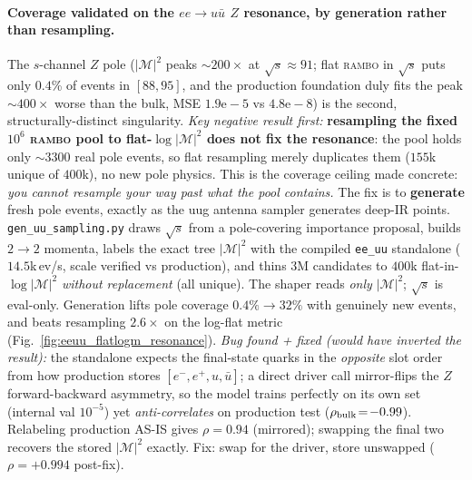\documentclass[11pt]{article}
\newcommand{\code}[1]{\texttt{#1}}
\begin{document}
\paragraph{Coverage validated on the $ee\to u\bar u$ $Z$ resonance, by generation rather than resampling.}
The $s$-channel $Z$ pole ($|\mathcal{M}|^2$ peaks $\sim$$200\times$ at $\sqrt{s}\!\approx\!91$; flat
\textsc{rambo} in $\sqrt{s}$ puts only $0.4$\% of events in $[88,95]$, and the production foundation
duly fits the peak $\sim$$400\times$ worse than the bulk, MSE $1.9\mathrm{e}{-}5$ vs $4.8\mathrm{e}{-}8$)
is the second, structurally-distinct singularity. \emph{Key negative result first:}
\textbf{resampling the fixed $10^6$ \textsc{rambo} pool to flat-$\log|\mathcal{M}|^2$ does not fix the
resonance}: the pool holds only $\sim$$3300$ real pole events, so flat resampling merely duplicates
them ($155$k unique of $400$k), no new pole physics. This is the coverage ceiling made concrete: \emph{you cannot resample your way past what the pool contains.} The fix is to
\textbf{generate} fresh pole events, exactly as the uug antenna sampler generates deep-IR points.
\code{gen\_uu\_sampling.py} draws $\sqrt{s}$ from a pole-covering importance proposal, builds $2\to2$
momenta, labels the exact tree $|\mathcal{M}|^2$ with the compiled \code{ee\_uu} standalone
($14.5$k\,ev/s, scale verified vs production), and thins $3\mathrm{M}$ candidates to $400$k
flat-in-$\log|\mathcal{M}|^2$ \emph{without replacement} (all unique). The shaper reads \emph{only}
$|\mathcal{M}|^2$; $\sqrt{s}$ is eval-only. Generation lifts pole coverage $0.4\%\!\to\!32\%$ with genuinely
new events, and beats resampling $2.6\times$ on the log-flat metric (Fig.~\ref{fig:eeuu_flatlogm_resonance}). \emph{Bug found + fixed (would have inverted the result):} the standalone expects
the final-state quarks in the \emph{opposite} slot order from how production stores $[e^-,e^+,u,\bar u]$;
a direct driver call mirror-flips the $Z$ forward-backward asymmetry, so the model trains perfectly on
its own set (internal val $10^{-5}$) yet \emph{anti-correlates} on production test ($\rho_{\rm bulk}\!=\!-0.99$).
Relabeling production AS-IS gives $\rho{=}0.94$ (mirrored); swapping the final two recovers the stored
$|\mathcal{M}|^2$ exactly. Fix: swap for the driver, store unswapped ($\rho{=}+0.994$ post-fix).
\end{document}
